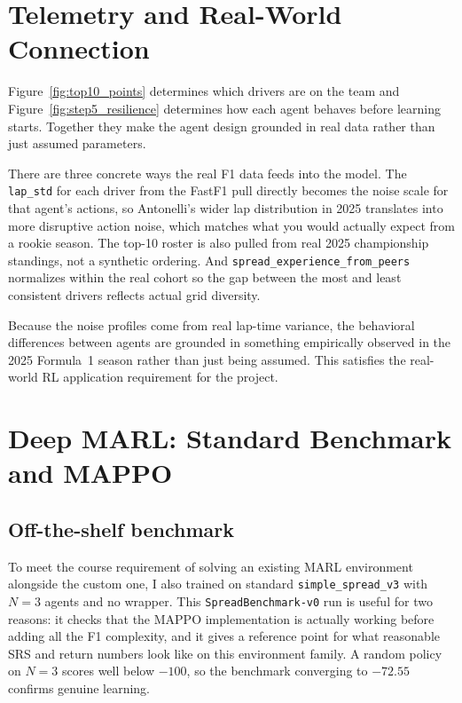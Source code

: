 \documentclass[11pt]{article}
\begin{document}
\section{Telemetry and Real-World Connection}

Figure~\ref{fig:top10_points} determines which drivers are on the team and
Figure~\ref{fig:step5_resilience} determines how each agent behaves before learning
starts. Together they make the agent design grounded in real data rather than just
assumed parameters.

There are three concrete ways the real F1 data feeds into the model. The \texttt{lap\_std}
for each driver from the FastF1 pull directly becomes the noise scale for that agent's
actions, so Antonelli's wider lap distribution in 2025 translates into more disruptive
action noise, which matches what you would actually expect from a rookie season. The
top-10 roster is also pulled from real 2025 championship standings, not a synthetic
ordering. And \texttt{spread\_experience\_from\_peers} normalizes within the real cohort
so the gap between the most and least consistent drivers reflects actual grid diversity.

Because the noise profiles come from real lap-time variance, the behavioral differences
between agents are grounded in something empirically observed in the 2025 Formula~1
season rather than just being assumed. This satisfies the real-world RL application
requirement for the project.

\section{Deep MARL: Standard Benchmark and MAPPO}

\subsection{Off-the-shelf benchmark}

To meet the course requirement of solving an existing MARL environment alongside the
custom one, I also trained on standard \texttt{simple\_spread\_v3} with $N{=}3$ agents
and no wrapper. This \texttt{SpreadBenchmark-v0} run is useful for two reasons: it checks
that the MAPPO implementation is actually working before adding all the F1 complexity,
and it gives a reference point for what reasonable SRS and return numbers look like on
this environment family. A random policy on $N{=}3$ scores well below $-100$, so the
benchmark converging to $-72.55$ confirms genuine learning.
\end{document}
